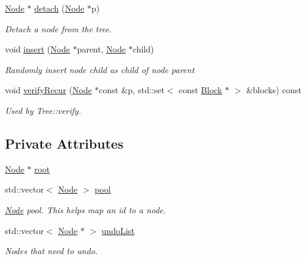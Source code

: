 \begin{DoxyCompactItemize}
\hyperlink{classTTree_1_1Node}{Node} $\ast$ \hyperlink{classTTree_ab9b74f48afd54c16fd1dc3b598019f7f}{detach} (\hyperlink{classTTree_1_1Node}{Node} $\ast$p)
\begin{DoxyCompactList}\small\item\em Detach a node from the tree. \end{DoxyCompactList}\item 
void \hyperlink{classTTree_a0bc18fd4039dc1ae0a53d2b68741a92b}{insert} (\hyperlink{classTTree_1_1Node}{Node} $\ast$parent, \hyperlink{classTTree_1_1Node}{Node} $\ast$child)
\begin{DoxyCompactList}\small\item\em Randomly insert node {\ttfamily child} as child of node {\ttfamily parent} \end{DoxyCompactList}\item 
void \hyperlink{classTTree_ab50938f36651a0cb2077ae84de2576a7}{verify\+Recur} (\hyperlink{classTTree_1_1Node}{Node} $\ast$const \&p, std\+::set$<$ const \hyperlink{structBlock}{Block} $\ast$ $>$ \&blocks) const 
\begin{DoxyCompactList}\small\item\em Used by Tree\+::verify. \end{DoxyCompactList}\end{DoxyCompactItemize}
\subsection*{Private Attributes}
\begin{DoxyCompactItemize}
\item 
\hyperlink{classTTree_1_1Node}{Node} $\ast$ \hyperlink{classTTree_a76972bd24a6d2f940fe1645d008a4a04}{root}
\item 
std\+::vector$<$ \hyperlink{classTTree_1_1Node}{Node} $>$ \hyperlink{classTTree_a58f7a793347834e9caee3d87c7202966}{pool}
\begin{DoxyCompactList}\small\item\em \hyperlink{classTTree_1_1Node}{Node} pool. This helps map an id to a node. \end{DoxyCompactList}\item 
std\+::vector$<$ \hyperlink{classTTree_1_1Node}{Node} $\ast$ $>$ \hyperlink{classTTree_a384e0ade54dfcb4688d646e3674e964a}{undo\+List}
\begin{DoxyCompactList}\small\item\em Nodes that need to undo. \end{DoxyCompactList}\end{DoxyCompactItemize}


